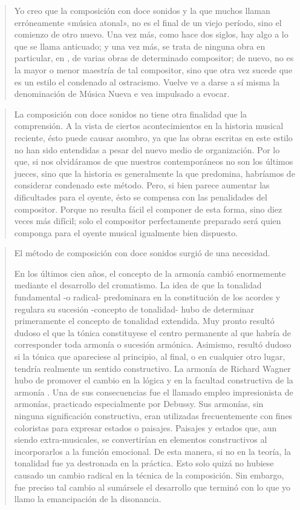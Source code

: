    \begin{quote}
    	Yo creo que la composición con doce sonidos y la que muchos llaman erróneamente «música atonal», no es el final de un viejo período, sino el comienzo de otro nuevo. Una vez más, como hace dos siglos, hay algo a lo que se llama anticuado; y una vez más, se trata de ninguna obra en particular, en , de varias obras de determinado compositor; de nuevo, no es la mayor o menor maestría de tal compositor, sino que otra vez sucede que es un estilo el condenado al ostracismo. Vuelve ve a darse a sí misma la denominación de Música Nueva e vea impulsado a evocar.
    \end{quote}

	\begin{quote}
		La composición con doce sonidos no tiene otra finalidad que la comprensión. A la vista de ciertos acontecimientos en la historia musical reciente, ésto puede causar asombro, ya que las obras escritas en este estilo no han sido entendidas a pesar del nuevo medio de organización. Por lo que, si nos olvidáramos de que nuestros contemporáneos no son los últimos jueces, sino que la historia es generalmente la que predomina, habríamos de considerar condenado este método. Pero, si bien parece aumentar las dificultades para el oyente, ésto se compensa con las penalidades del compositor. Porque no resulta fácil el componer de esta forma, sino diez veces más difícil; solo el compositor perfectamente preparado será quien componga para el oyente musical igualmente bien dispuesto.
	\end{quote}
    
    \begin{quote}
    	El método de composición con doce sonidos surgió de una necesidad.
    	
    	En los últimos cien años, el concepto de la armonía cambió enormemente mediante el desarrollo del cromatismo. La idea de que la tonalidad fundamental -o radical- predominara en la constitución de los acordes y regulara su sucesión -concepto de tonalidad- hubo de determinar primeramente el concepto de tonalidad extendida. Muy pronto resultó dudoso el que la tónica constituyese el centro permanente al que habría de corresponder toda armonía o sucesión armónica. Asimismo, resultó dudoso si la tónica que apareciese al principio, al final, o en cualquier otro lugar, tendría realmente un sentido constructivo. La armonía de Richard Wagner hubo de promover el cambio en la lógica y en la facultad constructiva de la armonía . Una de sus consecuencias fue el llamado empleo impresionista de armonías, practicado especialmente por Debussy. Sus armonías, sin ninguna significación constructiva, eran utilizadas frecuentemente con fines coloristas para expresar estados o paisajes. Paisajes y estados que, aun siendo extra-musicales, se convertirían en elementos constructivos al incorporarlos a la función emocional. De esta manera, si no en la teoría, la tonalidad fue ya destronada en la práctica. Esto solo quizá no hubiese causado un cambio radical en la técnica de la composición. Sin embargo, fue preciso tal cambio al sumársele el desarrollo que terminó con lo que yo llamo la emancipación de la disonancia.
    \end{quote}
    
